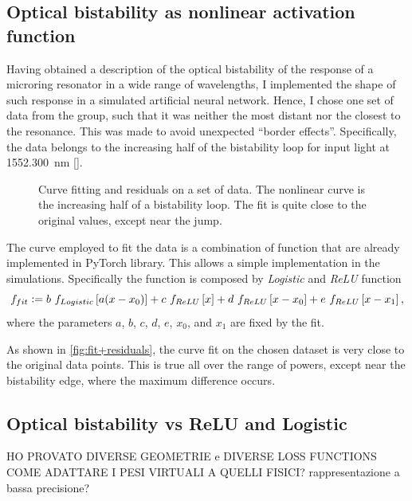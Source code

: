 \subsection{Optical bistability as nonlinear activation function}
\label{ssec:Optical_bistability_as_nonlinear_activation_function}
Having obtained a description of the optical bistability of the response of a microring resonator in a wide range of wavelengths, I implemented the shape of such response in a simulated artificial neural network.
Hence, I chose one set of data from the group, such that it was neither the most distant nor the closest to the resonance.
This was made to avoid unexpected ``border effects''.
Specifically, the data belongs to the increasing half of the bistability loop for input light at \SI{1552.300}{\nm} \ref{}.

\begin{figure}[htbp]
	\centering
	
	\caption{Curve fitting and residuals on a set of data.
	The nonlinear curve is the increasing half of a bistability loop.
	The fit is quite close to the original values, except near the jump.}
	\label{fig:fit+residuals}
\end{figure}

The curve employed to fit the data is a combination of function that are already implemented in PyTorch library.
This allows a simple implementation in the simulations.
Specifically the function is composed by \textit{Logistic} and \textit{ReLU} function
\begin{equation}
	f_{fit} \vcentcolon= b~f_{Logistic}\left[a(x-x_0)\right] + c~f_{ReLU}\left[x\right]+d~f_{ReLU}\left[x-x_0\right]+e~f_{ReLU}\left[x-x_1\right],
	\label{eq:fit}
\end{equation}
where the parameters $a$, $b$, $c$, $d$, $e$, $x_0$, and $x_1$ are fixed by the fit.

As shown in \autoref{fig:fit+residuals}, the curve fit on the chosen dataset is very close to the original data points.
This is true all over the range of powers, except near the bistability edge, where the maximum difference occurs.

\subsection{Optical bistability vs ReLU and Logistic}
\label{ssec:OBvsReLUvsSIGM}
HO PROVATO DIVERSE GEOMETRIE e DIVERSE LOSS FUNCTIONS\\
COME ADATTARE I PESI VIRTUALI A QUELLI FISICI? rappresentazione a bassa precisione?



